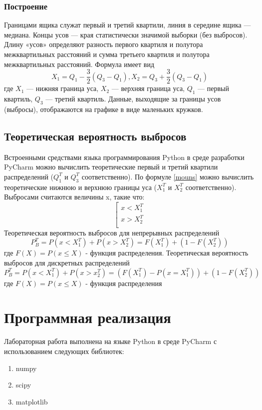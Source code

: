 \documentclass[a4paper]{article}
\begin{document}
	\subsubsection{Построение}
	\noindent Границами ящика служат первый и третий квартили, линия в середине ящика — медиана. Концы усов — края статистически значимой выборки (без выбросов). Длину «усов» определяют разность первого квартиля и полутора межквартильных расстояний и сумма третьего квартиля и полутора межквартильных расстояний. Формула имеет вид
	\begin{equation}
	\label{mouns}
	{X_1 = Q_1-} \frac{3}{2}{(Q_3 - Q_1)},   {X_2 = Q_3+} \frac{3}{2}{(Q_3 - Q_1)}
	\end{equation}
	где $X_1$ — нижняя граница уса, $X_2$ — верхняя граница уса, $Q_1$ — первый квартиль, $Q_3$ — третий квартиль. Данные, выходящие за границы усов (выбросы), отображаются на графике в виде маленьких кружков.


\subsection{Теоретическая вероятность выбросов}
	\noindent Встроенными средствами языка программирования Python в среде разработки PyCharm можно вычислить теоретические первый и третий квартили распределений ($Q_1^T$ и $Q_3^T$ соответственно). По формуле \eqref{mouns} можно вычислить теоретические нижнюю и верхнюю границы уса ($X_1^T$ и $X_2^T$ соответственно). Выбросами считаются величины x, такие что:
	\begin{equation}
		\left[
		\begin{gathered}
		x < X_1^T \\
		x > X_2^T \\
		\end{gathered}
		\right.
	\end{equation}
	Теоретическая вероятность выбросов для непрерывных распределений
	\begin{equation}
		P_B^T = P(x<X_1^T) + P(x>X_2^T)=F(X_1^T) + (1-F(X_2^T))
	\end{equation}
	где $F(X)=P(x\leq{X})$ - функция распределения.
	Теоретическая вероятность выбросов для дискретных распределений
	\begin{equation}
		P_B^T = P(x<X_1^T)+P(x>x_2^T)=(F(X_1^T)-P(x=X_1^T))+(1-F(X_2^T))
	\end{equation}
	где $F(X) = P(x\leq{X})$ - функция распределения

\section{Программная реализация}
Лабораторная работа выполнена на языке Python в среде PyCharm с использованием следующих библиотек:
\begin{enumerate}
    \item numpy
    \item scipy
    \item matplotlib
\end{enumerate}
\end{document}
